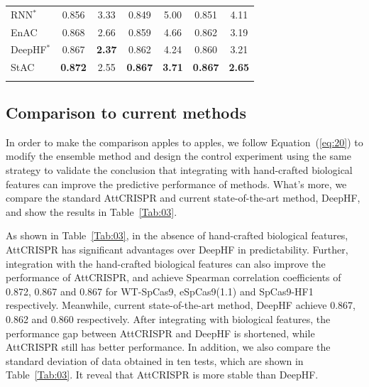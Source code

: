 \documentclass{bioinfo}
\begin{document}
\begin{table}[!tpb]
{\begin{tabular}{lcccccc}
        RNN$^*$ & 0.856 & 3.33 & 0.849 & 5.00 & 0.851 & 4.11 \\
        EnAC   & 0.868 & 2.66 & 0.859 & 4.66 & 0.862 & 3.19 \\
        DeepHF$^*$ & 0.867 & \textbf{2.37} & 0.862 & 4.24 & 0.860 & 3.21 \\
        StAC   & \textbf{0.872} & 2.55 & \textbf{0.867} & \textbf{3.71} & \textbf{0.867} & \textbf{2.65} \\
     \botrule
\end{tabular}}\footnotesize{}
\end{table}

\subsection{Comparison to current methods}\label{section:comparison}

In order to make the comparison apples to apples, 
we follow Equation~(\ref{eq:20}) to modify the ensemble method and design the control experiment using the same strategy to validate the conclusion that integrating with hand-crafted biological features can improve the predictive performance of methods. 
What's more, we compare the standard AttCRISPR and current state-of-the-art method, DeepHF, and show the results in Table~\ref{Tab:03}. 

As shown in Table~\ref{Tab:03}, in the absence of hand-crafted biological features, AttCRISPR has significant advantages over DeepHF in predictability. 
Further, integration with the hand-crafted biological features can also improve the performance of AttCRISPR, and achieve Spearman correlation coefficients of 0.872, 0.867 and 0.867 for WT-SpCas9, eSpCas9(1.1) and SpCas9-HF1 respectively. Meanwhile, current state-of-the-art method, DeepHF achieve 0.867, 0.862 and 0.860 respectively. 
After integrating with biological features, the performance gap between AttCRISPR and DeepHF is shortened, while AttCRISPR still has better performance. In addition, we also compare the standard deviation of data obtained in ten tests, which are shown in Table~\ref{Tab:03}. 
It reveal that AttCRISPR is more stable than DeepHF.
\end{document}
